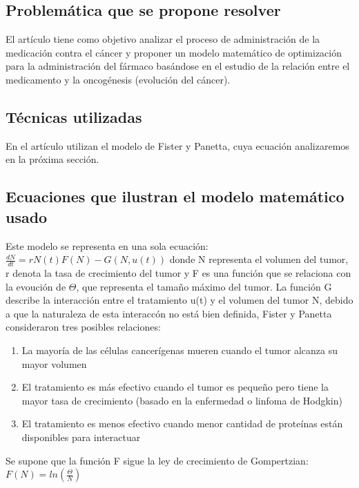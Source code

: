\documentclass[a4 paper, 12pt]{article}
\begin{document}
\subsection{Problem\'atica que se propone resolver}
El art\'iculo tiene como objetivo analizar el proceso de administraci\'on de la medicaci\'on contra el c\'ancer y proponer un modelo matem\'atico de optimizaci\'on para la administraci\'on del f\'armaco bas\'andose en
el estudio de la relaci\'on entre el medicamento y la oncog\'enesis (evoluci\'on del c\'ancer).

\subsection{T\'ecnicas utilizadas}
En el art\'iculo utilizan el modelo de Fister y Panetta, cuya ecuaci\'on analizaremos en la pr\'oxima secci\'on.

\subsection{Ecuaciones que ilustran el modelo matem\'atico usado}

Este modelo se representa en una sola ecuaci\'on:\\[10pt]
$\frac{dN}{dt} = rN(t)F(N) - G(N,u(t))$
donde N representa el volumen del tumor, r denota la tasa de crecimiento del tumor y F es una funci\'on que se relaciona con la evouci\'on de $\Theta$, que representa el tama\~{n}o m\'aximo del tumor. 
La funci\'on G describe la interacci\'on entre el tratamiento u(t) y el volumen del tumor N, debido a que la naturaleza de esta interacc\'on no est\'a bien definida, Fister y Panetta consideraron tres posibles relaciones:
\begin{enumerate}
\item La mayor\'ia de las c\'elulas cancer\'igenas mueren cuando el tumor alcanza su mayor volumen
\item El tratamiento es m\'as efectivo cuando el tumor es peque\~{n}o pero tiene la mayor tasa de crecimiento (basado en la enfermedad o linfoma de Hodgkin)
\item El tratamiento es menos efectivo cuando menor cantidad de prote\'inas est\'an disponibles para interactuar
\end{enumerate}

Se supone que la funci\'on F sigue la ley de crecimiento de Gompertzian: \\
$ F(N) = ln(\frac{\Theta }{N})$ \\[10pt]
\end{document}
